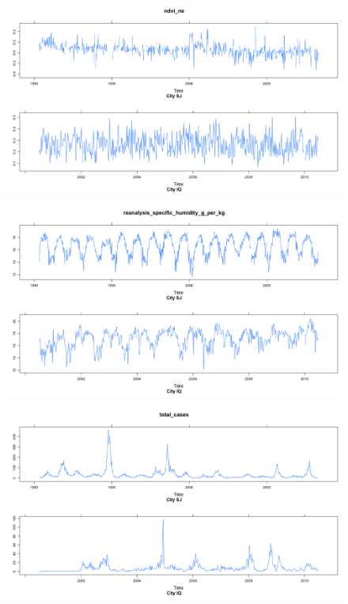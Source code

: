 \documentclass[floatsintext,man]{apa6}
\theoremstyle{definition}
\theoremstyle{definition}
\theoremstyle{definition}
\theoremstyle{remark}
\begin{document}
\begin{figure}[!h]
\includegraphics[width=\textwidth]{Final_report_files/figure-latex/unnamed-chunk-1-1} \caption{ }\label{fig:unnamed-chunk-1}
\end{figure}\begin{figure}[!h]
\includegraphics[width=\textwidth]{Final_report_files/figure-latex/unnamed-chunk-2-1} \caption{ }\label{fig:unnamed-chunk-2}
\end{figure}\begin{figure}[!h]
\includegraphics[width=\textwidth]{Final_report_files/figure-latex/unnamed-chunk-3-1} \caption{ }\label{fig:unnamed-chunk-3}
\end{figure}
\end{document}
